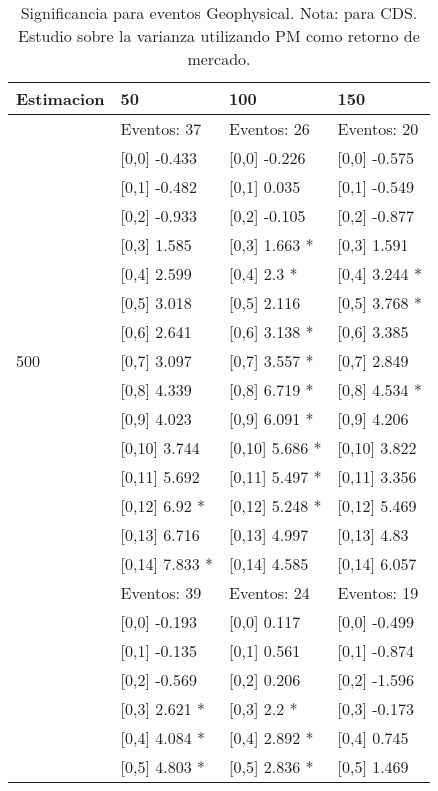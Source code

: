 \begin{table}

\caption{Significancia para eventos Geophysical. Nota: para CDS. Estudio sobre la varianza utilizando PM como retorno de mercado.}
\centering
\begin{tabular}[t]{llll}
\toprule
Estimacion & 50 & 100 & 150\\
\midrule
 & Eventos:  37 & Eventos:  26 & Eventos:  20\\
 & {}[0,0] -0.433 & {}[0,0] -0.226 & {}[0,0] -0.575\\
 & {}[0,1] -0.482 & {}[0,1] 0.035 & {}[0,1] -0.549\\
 & {}[0,2] -0.933 & {}[0,2] -0.105 & {}[0,2] -0.877\\
 & {}[0,3] 1.585 & {}[0,3] 1.663 * & {}[0,3] 1.591\\
\addlinespace
 & {}[0,4] 2.599 & {}[0,4] 2.3 * & {}[0,4] 3.244 *\\
 & {}[0,5] 3.018 & {}[0,5] 2.116 & {}[0,5] 3.768 *\\
 & {}[0,6] 2.641 & {}[0,6] 3.138 * & {}[0,6] 3.385\\
500 & {}[0,7] 3.097 & {}[0,7] 3.557 * & {}[0,7] 2.849\\
 & {}[0,8] 4.339 & {}[0,8] 6.719 * & {}[0,8] 4.534 *\\
\addlinespace
 & {}[0,9] 4.023 & {}[0,9] 6.091 * & {}[0,9] 4.206\\
 & {}[0,10] 3.744 & {}[0,10] 5.686 * & {}[0,10] 3.822\\
 & {}[0,11] 5.692 & {}[0,11] 5.497 * & {}[0,11] 3.356\\
 & {}[0,12] 6.92 * & {}[0,12] 5.248 * & {}[0,12] 5.469\\
 & {}[0,13] 6.716 & {}[0,13] 4.997 & {}[0,13] 4.83\\
\addlinespace
 & {}[0,14] 7.833 * & {}[0,14] 4.585 & {}[0,14] 6.057\\
 & Eventos:  39 & Eventos:  24 & Eventos:  19\\
 & {}[0,0] -0.193 & {}[0,0] 0.117 & {}[0,0] -0.499\\
 & {}[0,1] -0.135 & {}[0,1] 0.561 & {}[0,1] -0.874\\
 & {}[0,2] -0.569 & {}[0,2] 0.206 & {}[0,2] -1.596\\
\addlinespace
 & {}[0,3] 2.621 * & {}[0,3] 2.2 * & {}[0,3] -0.173\\
 & {}[0,4] 4.084 * & {}[0,4] 2.892 * & {}[0,4] 0.745\\
 & {}[0,5] 4.803 * & {}[0,5] 2.836 * & {}[0,5] 1.469\\

\end{tabular}
\end{table}
